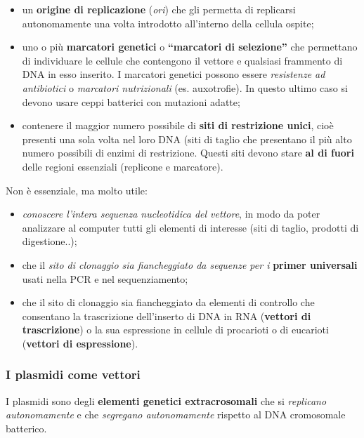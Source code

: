 \documentclass[]{article}
\begin{document}
\begin{itemize}
\itemsep1pt\parskip0pt
\item
  un \textbf{origine di replicazione} (\emph{ori}) che gli permetta di
  replicarsi autonomamente una volta introdotto all'interno della
  cellula ospite;
\item
  uno o più \textbf{marcatori genetici} o \textbf{``marcatori di
  selezione''} che permettano di individuare le cellule che contengono
  il vettore e qualsiasi frammento di DNA in esso inserito. I marcatori
  genetici possono essere \emph{resistenze ad antibiotici} o
  \emph{marcatori nutrizionali} (es. auxotrofie). In questo ultimo caso
  si devono usare ceppi batterici con mutazioni adatte;
\item
  contenere il maggior numero possibile di \textbf{siti di restrizione
  unici}, cioè presenti una sola volta nel loro DNA (siti di taglio che
  presentano il più alto numero possibili di enzimi di restrizione.
  Questi siti devono stare \textbf{al di fuori} delle regioni essenziali
  (replicone e marcatore).
\end{itemize}

Non è essenziale, ma molto utile:

\begin{itemize}
\itemsep1pt\parskip0pt
\item
  \emph{conoscere l'intera sequenza nucleotidica del vettore}, in modo
  da poter analizzare al computer tutti gli elementi di interesse (siti
  di taglio, prodotti di digestione..);
\item
  che il \emph{sito di clonaggio sia fiancheggiato da sequenze per i}
  \textbf{primer universali} usati nella PCR e nel sequenziamento;
\item
  che il sito di clonaggio sia fiancheggiato da elementi di controllo
  che consentano la trascrizione dell'inserto di DNA in RNA
  (\textbf{vettori di trascrizione}) o la sua espressione in cellule di
  procarioti o di eucarioti (\textbf{vettori di espressione}).
\end{itemize}

\subsubsection{I plasmidi come vettori}\label{i-plasmidi-come-vettori}

I plasmidi sono degli \textbf{elementi genetici extracrosomali} che si
\emph{replicano autonomamente} e che \emph{segregano autonomamente}
rispetto al DNA cromosomale batterico.
\end{document}
